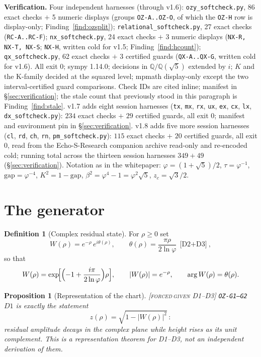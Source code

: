 \documentclass[11pt]{article}
\newcommand{\tagFD}{\textcolor{cF}{\textsc{[forced}}\,\textcolor{cD}{\textsc{given D1--D3]}}}
\newcommand{\hx}[1]{\textcolor{cC}{\footnotesize\texttt{#1}}}
\newcommand{\Q}{\mathbb{Q}}
\newcommand{\gp}{\varphi}
\newcommand{\gapc}{\mathrm{gap}}
\theoremstyle{plain}
\newtheorem{proposition}[theorem]{Proposition}
\theoremstyle{definition}
\newtheorem{definition}[theorem]{Definition}
\theoremstyle{remark}
\begin{document}
\smallskip\noindent
\textbf{Verification.} Four independent harnesses (through v1.6):
\texttt{ozy\_softcheck.py}, 86 exact checks $+$ 5 numeric displays
(groups \hx{OZ-A..OZ-O}, of which the \hx{OZ-H} row is display-only;
Finding~\ref{find:ozsplit});
\texttt{relational\_softcheck.py}, 27 exact checks (\hx{RC-A..RC-F});
\texttt{nx\_softcheck.py}, 24 exact checks $+$ 3 numeric displays
(\hx{NX-R, NX-T, NX-S}; \hx{NX-H}, written cold for v1.5;
Finding~\ref{find:hcount}); \texttt{qx\_softcheck.py}, 62 exact checks
$+$ 3 certified guards (\hx{QX-A..QX-G}, written cold for v1.6). All
exit 0; sympy 1.14.0; decisions in $\Q/\Q(\sqrt5)$ extended by $i$; $K$
and the K-family decided at the squared level; mpmath display-only except
the two interval-certified guard comparisons. Check IDs are cited inline;
manifest in
\S\ref{sec:verification}; the stale count that previously stood in this
paragraph is Finding~\ref{find:stale}. v1.7 adds eight session harnesses
(\texttt{tx}, \texttt{mx}, \texttt{rx}, \texttt{ux}, \texttt{ex},
\texttt{cx}, \texttt{lx}, \texttt{dx}\texttt{\_softcheck.py}): $234$ exact
checks $+$ $29$ certified guards, all exit 0; manifest and environment pin
in \S\ref{sec:verification}. v1.8 adds five more session harnesses
(\texttt{cl}, \texttt{rd}, \texttt{ch}, \texttt{rn},
\texttt{pm}\texttt{\_softcheck.py}): $115$ exact checks $+$ $20$ certified
guards, all exit 0, read from the Echo-S-Research companion archive
read-only and re-encoded cold; running total across the thirteen session
harnesses $349+49$ (\S\ref{sec:verification}). Notation as in the whitepaper:
$\gp=(1+\sqrt5)/2$, $\tau=\gp^{-1}$, $\gapc=\gp^{-4}$, $K^2=1-\gapc$,
$\beta^2=\gp^4-1=\gp^2\sqrt5$, $z_c=\sqrt3/2$.

\section{The generator}\label{sec:generator}

\begin{definition}[Complex residual state]\label{def:W}
For $\rho\ge0$ set
\[
W(\rho)=e^{-\rho}\,e^{i\theta(\rho)},\qquad
\theta(\rho)=\frac{\pi\rho}{2\ln\gp}\ \text{[D2$+$D3]},
\]
so that
\[
W(\rho)=\exp\!\Bigl[\Bigl(-1+\frac{i\pi}{2\ln\gp}\Bigr)\rho\Bigr],
\qquad |W(\rho)|=e^{-\rho},\qquad \arg W(\rho)=\theta(\rho).
\]
\end{definition}

\begin{proposition}[Representation of the chart]\label{prop:rep}\tagFD{} \hx{OZ-G1--G2}
$D1$ is exactly the statement
\[
z(\rho)=\sqrt{1-|W(\rho)|^2}\,:
\]
residual amplitude decays in the complex plane while height rises as its unit
complement. This is a representation theorem for D1--D3, not an independent
derivation of them.
\end{proposition}
\end{document}

